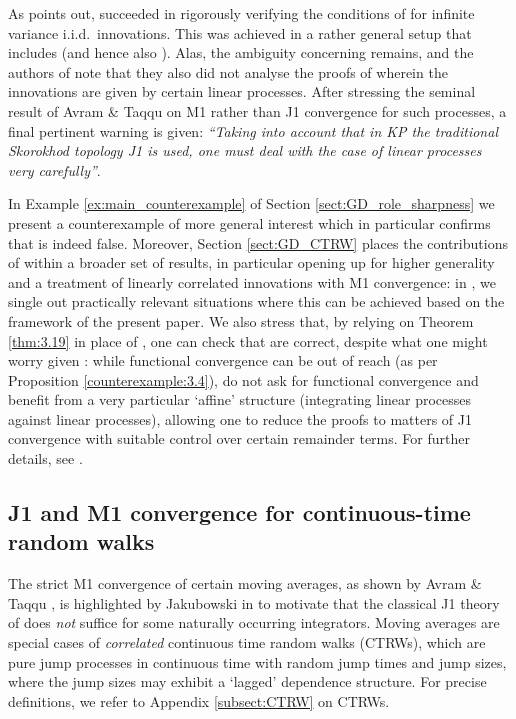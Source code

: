\documentclass[11pt]{article}
\theoremstyle{definition}\newtheorem{example}[theorem]{Example}
\theoremstyle{definition}\newtheorem{counterexample}[theorem]{Counterexample}
\theoremstyle{definition}\newtheorem{remark}[theorem]{Remark}
\theoremstyle{definition}\newtheorem{defi}[theorem]{Definition}
\numberwithin{equation}{section}
\renewcommand{\|}{\; : \, \;}											%
\begin{document}
As \cite{fabozzi_comment} points out, \cite{paulaskas_rachev} succeeded in rigorously verifying the conditions of \cite[Thm.~2.7]{kurtzprotter} for infinite variance i.i.d.~innovations. This was achieved in a rather general setup that includes \cite[Thm.~3]{caner1} (and hence also \cite[Thm.~4]{caner2}). Alas, the ambiguity concerning \cite[Thm.~2]{caner1} remains, and the authors of \cite{fabozzi_comment} note that they also did not analyse the proofs of \cite[Thms.~5 \& 6]{caner1} wherein the innovations are given by certain linear processes. After stressing the seminal result of Avram \& Taqqu \cite{avram} on M1 rather than J1 convergence for such processes, a final pertinent warning is given: \emph{``Taking into account that in KP the traditional Skorokhod topology J1 is used, one must deal with the case of linear processes very carefully''}.

In Example \ref{ex:main_counterexample} of Section \ref{sect:GD_role_sharpness} we present a counterexample of more general interest which in particular confirms that \cite[Thm.~2]{caner1} is indeed false. Moreover, Section \ref{sect:GD_CTRW} places the contributions of \cite{paulaskas_rachev} within a broader set of results, in particular opening up for higher generality and a treatment of linearly correlated innovations with M1 convergence: in \cite{andreasfabrice_applications}, we single out practically relevant situations where this can be achieved based on the framework of the present paper. We also stress that, by relying on Theorem \ref{thm:3.19} in place of \cite[Thm.~2]{caner1}, one can check that \cite[Thms.~5 and 6]{caner1} are correct, despite what one might worry given \cite{fabozzi_comment}: while functional convergence can be out of reach (as per Proposition \ref{counterexample:3.4}), \cite[Thms.~5 and 6]{caner1} do not ask for functional convergence and benefit from a very particular `affine' structure (integrating linear processes against linear processes), allowing one to reduce the proofs to matters of J1 convergence with suitable control over certain remainder terms. For further details, see \cite{andreasfabrice_applications}.



\subsection{J1 and M1 convergence for continuous-time random walks}\label{subsect:applications_CTRW}

The strict M1 convergence of certain moving averages, as shown by Avram \& Taqqu \cite{avram}, is highlighted by Jakubowski in \cite[Example 2]{jakubowski} to motivate that the classical J1 theory of \cite{jakubowskimeminpages,kurtzprotter} does \emph{not} suffice for some naturally occurring integrators. Moving averages are special cases of \emph{correlated} continuous time random walks (CTRWs), which are pure jump processes in continuous time with random jump times and jump sizes, where the jump sizes may exhibit a `lagged' dependence structure. For precise definitions, we refer to Appendix  \ref{subsect:CTRW} on CTRWs.
\end{document}
